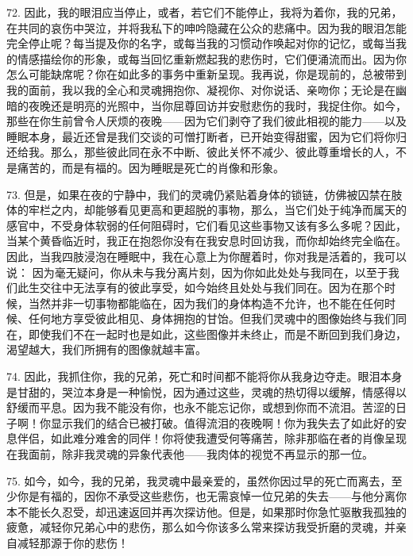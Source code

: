 72. 因此，我的眼泪应当停止，或者，若它们不能停止，我将为着你，我的兄弟，在共同的哀伤中哭泣，并将我私下的呻吟隐藏在公众的悲痛中。因为我的眼泪怎能完全停止呢？每当提及你的名字，或每当我的习惯动作唤起对你的记忆，或每当我的情感描绘你的形象，或每当回忆重新燃起我的悲伤时，它们便涌流而出。因为你怎么可能缺席呢？你在如此多的事务中重新呈现。我再说，你是现前的，总被带到我的面前，我以我的全心和灵魂拥抱你、凝视你、对你说话、亲吻你；无论是在幽暗的夜晚还是明亮的光照中，当你屈尊回访并安慰悲伤的我时，我捉住你。如今，那些在你生前曾令人厌烦的夜晚——因为它们剥夺了我们彼此相视的能力——以及睡眠本身，最近还曾是我们交谈的可憎打断者，已开始变得甜蜜，因为它们将你归还给我。那么，那些彼此同在永不中断、彼此关怀不减少、彼此尊重增长的人，不是痛苦的，而是有福的。因为睡眠是死亡的肖像和形象。\par

73. 但是，如果在夜的宁静中，我们的灵魂仍紧贴着身体的锁链，仿佛被囚禁在肢体的牢栏之内，却能够看见更高和更超脱的事物，那么，当它们处于纯净而属天的感官中，不受身体软弱的任何阻碍时，它们看见这些事物又该有多么多呢？因此，当某个黄昏临近时，我正在抱怨你没有在我安息时回访我，而你却始终完全临在。因此，当我四肢浸泡在睡眠中，我在心意上为你醒着时，你对我是活着的，我可以说： 因为毫无疑问，你从未与我分离片刻，因为你如此处处与我同在，以至于我们此生交往中无法享有的彼此享受，如今始终且处处与我们同在。因为在那个时候，当然并非一切事物都能临在，因为我们的身体构造不允许，也不能在任何时候、任何地方享受彼此相见、身体拥抱的甘饴。但我们灵魂中的图像始终与我们同在，即使我们不在一起时也是如此，这些图像并未终止，而是不断回到我们身边，渴望越大，我们所拥有的图像就越丰富。\par

74. 因此，我抓住你，我的兄弟，死亡和时间都不能将你从我身边夺走。眼泪本身是甘甜的，哭泣本身是一种愉悦，因为通过这些，灵魂的热切得以缓解，情感得以舒缓而平息。因为我不能没有你，也永不能忘记你，或想到你而不流泪。苦涩的日子啊！你显示我们的结合已被打破。值得流泪的夜晚啊！你为我失去了如此好的安息伴侣，如此难分难舍的同伴！你将使我遭受何等痛苦，除非那临在者的肖像呈现在我面前，除非我灵魂的异象代表他——我肉体的视觉不再显示的那一位。\par

75. 如今，如今，我的兄弟，我灵魂中最亲爱的，虽然你因过早的死亡而离去，至少你是有福的，因你不承受这些悲伤，也无需哀悼一位兄弟的失去——与他分离你本不能长久忍受，却迅速返回并再次探访他。但是，如果那时你急忙驱散我孤独的疲惫，减轻你兄弟心中的悲伤，那么如今你该多么常来探访我受折磨的灵魂，并亲自减轻那源于你的悲伤！\par

